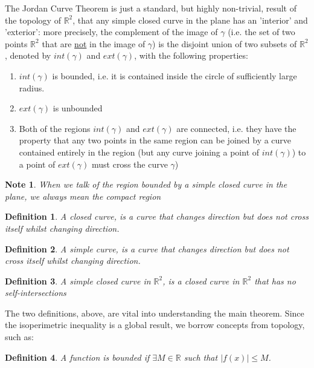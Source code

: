 \documentclass[a4paper]{book}
\newtheorem{note}{Note}%
\newtheorem{definition}{Definition}%
\begin{document}
The Jordan Curve Theorem is just a standard, but highly non-trivial, result of the topology of $\mathbb{R}^2$, that any simple closed curve in the plane has an 'interior' and 'exterior': more precisely, the complement of the image of $\gamma$ (i.e. the set of two points $\mathbb{R}^2$ that are \underline{not} in the image of $\gamma$) is the disjoint union of two subsets of $\mathbb{R}^2$, denoted by $int(\gamma)$ and $ext(\gamma)$, with the following properties:
\begin{enumerate}
    \item $int(\gamma)$ is bounded, i.e. it is contained inside the circle of sufficiently large radius.
    \item $ext(\gamma)$ is unbounded
    \item Both of the regions $int(\gamma)$ and $ext(\gamma)$ are connected, i.e. they have the property that any two points in the same region can be joined by a curve contained entirely in the region (but any curve joining a point of $int(\gamma)$) to a point of $ext(\gamma)$ must cross the curve $\gamma$)
\end{enumerate}


\begin{note} 
    When we talk of the region bounded by a simple closed curve in the plane, we always mean the compact region
\end{note}

\begin{definition}
    A closed curve, is a curve that changes direction but does not cross itself whilst changing direction.
\end{definition}

\begin{definition}
    A simple curve, is a curve that changes direction but does not cross itself whilst changing direction.
\end{definition}

\begin{definition}
    A simple closed curve in $\mathbb{R}^2$, is a closed curve in $\mathbb{R}^2$ that has no self-intersections
\end{definition}

The two definitions, above, are vital into understanding the main theorem. Since the isoperimetric inequality is a global result, we borrow concepts from topology, such as:

\begin{definition}
    A function is bounded if $\exists M \in \mathbb{R}$ such that $\left| f(x) \right| \leq M$.
\end{definition}
\end{document}
